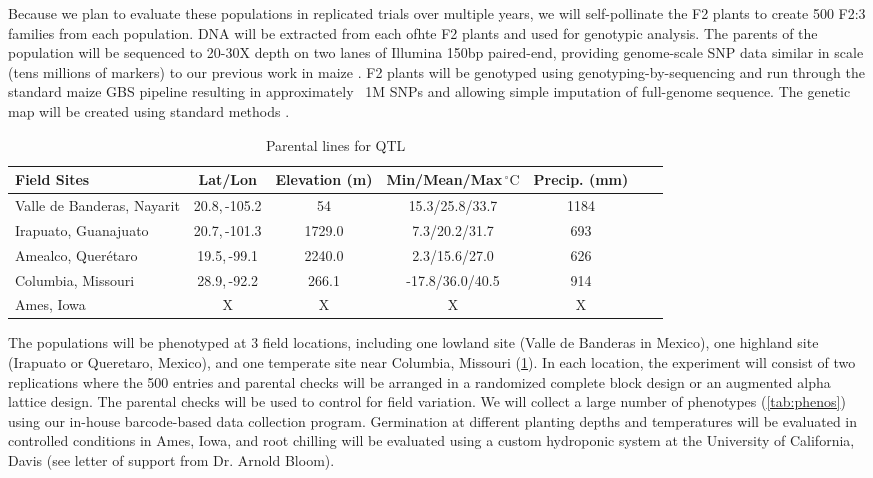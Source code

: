 Because we plan to evaluate these populations in replicated trials over multiple years, we will self-pollinate the F2 plants to create 500 F2:3 families from each population.  DNA will be extracted from each ofhte F2 plants and used for genotypic analysis.   The parents of the population will be sequenced to 20-30X depth on two lanes of Illumina 150bp paired-end, providing genome-scale SNP data similar in scale (tens millions of markers) to our previous work in maize  \citep[HapMap.v2;][]{Chia2012a}.  F2 plants will be genotyped using genotyping-by-sequencing \citep[GBS;][]{Elshire2011} and run through the standard maize GBS pipeline \citep{Glaubitz2014} resulting in approximately ~1M SNPs and allowing simple imputation of full-genome sequence.  The genetic map will be created using standard methods \citep[e.g.][]{Broman2003a}. 

\begin{table}
\begin{center}
\caption{Parental lines for QTL} \label{tab:locales}
\begin{tabular}{p{3cm}cccccc}\\\toprule  
{\bf Field Sites} & {\bf Lat/Lon } & {\bf Elevation (m) } &	{\bf Min/Mean/Max\,$^{\circ} \mathrm{C}$  } & {\bf Precip. (mm) } \\ \toprule
Valle de Banderas, Nayarit	& 20.8,\,-105.2&	54		&	15.3/25.8/33.7	&	1184 \\
Irapuato, Guanajuato 	&	20.7,\,-101.3	&	1729.0	&	7.3/20.2/31.7	&	693 \\
Amealco, Quer\'etaro 	&	19.5,\,-99.1	&	2240.0 	&	2.3/15.6/27.0	&	626\\
Columbia, Missouri		& 	28.9,\,-92.2	&	266.1 	&	-17.8/36.0/40.5&	914\\
Ames, Iowa	& 	X	&	X 	&	X		&	X	 \\ \bottomrule
\end{tabular}
\end{center}
\end{table} 

The populations will be phenotyped at 3 field locations, including one lowland site (Valle de Banderas in Mexico), one highland site (Irapuato or Queretaro, Mexico), and one temperate site near Columbia, Missouri (\ref{tab:locales}).  In each location, the experiment will consist of two replications where the 500 entries and parental checks will be arranged in a randomized complete block design or an augmented alpha lattice design. The parental checks will be used to control for field variation.  We will collect a large number of phenotypes (\ref{tab:phenos}) using our in-house barcode-based data collection program. Germination at different planting depths and temperatures will be evaluated in controlled conditions in Ames, Iowa, and root chilling will be evaluated using a custom hydroponic system at the University of California, Davis (see letter of support from Dr. Arnold Bloom).    


